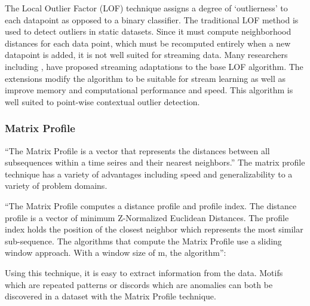 The Local Outlier Factor (LOF) technique assigns a degree of `outlierness' to each datapoint as opposed to a binary classifier. The traditional LOF method is used to detect outliers in static datasets. Since it must compute neighborhood distances for each data point, which must be recomputed entirely when a new datapoint is added, it is not well suited for streaming data. Many researchers including \parencite{dilof-data-streams}, \parencite{fast-memory-efficent-lof-milof} have proposed streaming adaptations to the base LOF algorithm. The extensions modify the algorithm to be suitable for stream learning as well as improve memory and computational performance and speed. This algorithm is well suited to point-wise contextual outlier detection.

\subsubsection{Matrix Profile} %
\label{ref_matrix-profile-alg}
\enquote{The Matrix Profile is a vector that represents the distances between all subsequences within a time seires and their nearest neighbors.} \parencite{yeh2016matrix-profile-1} The matrix profile technique has a variety of advantages including speed and generalizability to a variety of problem domains. 

\enquote{The Matrix Profile computes a distance profile and profile index. The distance profile is a vector of minimum Z-Normalized Euclidean Distances. The profile index holds the position of the closest neighbor which represents the most similar sub-sequence. The algorithms that compute the Matrix Profile use a sliding window approach. With a window size of m, the algorithm}\parencite{matrix-profile-intro}:

Using this technique, it is easy to extract information from the data. Motifs which are repeated patterns or discords which are anomalies can both be discovered in a dataset with the Matrix Profile technique. 

